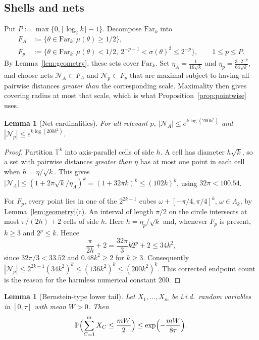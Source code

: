 \documentclass[11pt,reqno]{amsart}
\theoremstyle{plain}
\newtheorem{lemma}[theorem]{Lemma}
\theoremstyle{definition}
\theoremstyle{remark}
\newcommand{\T}{\mathbb T}
\begin{document}
\subsection{Shells and nets}
Put \(P:=\max\{0,\lceil\log_2k\rceil-1\}\). Decompose \(\mathrm{Far}_k\) into
\begin{align*}
  F_A&:=\{\theta\in\mathrm{Far}_k:\mu(\theta)\ge1/2\},\\
  F_p&:=\{\theta\in\mathrm{Far}_k:\mu(\theta)<1/2,\
    2^{-p-1}<\sigma(\theta)^2\le2^{-p}\},\qquad1\le p\le P.
\end{align*}
By Lemma~\ref{lem:geometry}, these sets cover \(\mathrm{Far}_k\). Set
\(\eta_A=\tfrac1{16\sqrt k}\) and \(\eta_p=\tfrac{3\cdot2^{-p}}{64\sqrt k}\),
and choose nets \(\mathcal N_A\subset F_A\) and \(\mathcal N_p\subset F_p\)
that are maximal subject to having all pairwise distances \emph{greater than}
the corresponding scale. Maximality then gives covering radius at most that
scale, which is what Proposition~\ref{prop:pointwise} uses.

\begin{lemma}[Net cardinalities]\label{lem:nets}
For all relevant \(p\),
\(|\mathcal N_A|\le e^{k\log(200k^2)}\) and
\(|\mathcal N_p|\le e^{k\log(200k^2)}\).
\end{lemma}

\begin{proof}
Partition \(\T^k\) into axis-parallel cells of side \(h\). A cell has diameter
\(h\sqrt k\), so a set with pairwise distances \emph{greater than} \(\eta\) has
at most one point in each cell when \(h=\eta/\sqrt k\). This gives
\(|\mathcal N_A|\le(1+2\pi\sqrt k/\eta_A)^k=(1+32\pi k)^k\le(102k)^k\),
using \(32\pi<100.54\).

For \(F_p\), every point lies in one of the \(2^{2k-1}\) cubes
\(\omega+[-\pi/4,\pi/4]^k\), \(\omega\in\Lambda_k\), by
Lemma~\ref{lem:geometry}(c). An interval of length \(\pi/2\) on the circle
intersects at most \(\pi/(2h)+2\) cells of side \(h\). Here
\(h=\eta_p/\sqrt k\) and, whenever \(F_p\) is present, \(k\ge3\) and
\(2^p\le k\). Hence
\[
  \frac\pi{2h}+2=\frac{32\pi}3k2^p+2\le34k^2,
\]
since \(32\pi/3<33.52\) and \(0.48k^2\ge2\) for \(k\ge3\). Consequently
\(|\mathcal N_p|\le2^{2k-1}(34k^2)^k\le(136k^2)^k\le(200k^2)^k\). This
corrected endpoint count is the reason for the harmless numerical constant
\(200\).
\end{proof}

\begin{lemma}[Bernstein-type lower tail]\label{lem:bernstein}
Let \(X_1,\dots,X_m\) be i.i.d.\ random variables in \([0,\tau]\) with mean
\(W>0\). Then
\[
  \mathbb P\Bigl(\sum_{C=1}^mX_C\le\frac{mW}2\Bigr)
  \le\exp\Bigl(-\frac{mW}{8\tau}\Bigr).
\]
\end{lemma}
\end{document}
